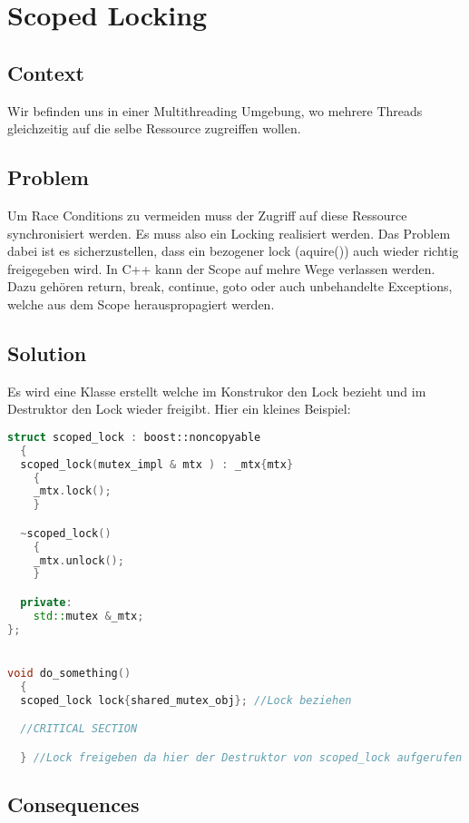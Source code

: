 \chapter{Scoped Locking}

\section{Context}
Wir befinden uns in einer Multithreading Umgebung, wo mehrere Threads gleichzeitig auf die selbe Ressource zugreiffen wollen.

\section{Problem}
Um Race Conditions zu vermeiden muss der Zugriff auf diese Ressource synchronisiert werden. Es muss also ein Locking realisiert werden. Das Problem dabei ist es sicherzustellen, dass ein bezogener lock (aquire()) auch wieder richtig freigegeben wird. In C++ kann der Scope auf mehre Wege verlassen werden. Dazu gehören return, break, continue, goto oder auch unbehandelte Exceptions, welche aus dem Scope herauspropagiert werden.

\section{Solution}
Es wird eine Klasse erstellt welche im Konstrukor den Lock bezieht und im Destruktor den Lock wieder freigibt.
Hier ein kleines Beispiel:
\begin{lstlisting}[language=C++]
struct scoped_lock : boost::noncopyable
  {
  scoped_lock(mutex_impl & mtx ) : _mtx{mtx} 
    { 
    _mtx.lock();
    }

  ~scoped_lock() 
    { 
    _mtx.unlock();
    }

  private:
    std::mutex &_mtx;
};


void do_something()
  {
  scoped_lock lock{shared_mutex_obj}; //Lock beziehen

  //CRITICAL SECTION

  } //Lock freigeben da hier der Destruktor von scoped_lock aufgerufen wird.
\end{lstlisting}

\section{Consequences}
\begin{itemize}
  \end{itemize}

